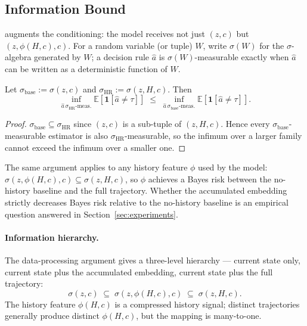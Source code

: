 \subsection{\temporalmethodfull{} Information Bound}
\label{app:history-monotonicity}

\temporalmethodfull augments the conditioning: the model receives not just $(z, c)$ but $(z, \phi(H, c), c)$. For a random variable (or tuple) $W$, write $\sigma(W)$ for the $\sigma$-algebra generated by $W$; a decision rule $\hat{a}$ is $\sigma(W)$-measurable exactly when $\hat{a}$ can be written as a deterministic function of $W$.

\begin{proposition}
\label{prop:history-monotonicity}
Let $\sigma_{\mathrm{base}} := \sigma(z, c)$ and $\sigma_{\mathrm{HR}} := \sigma(z, H, c)$. Then
\[
\inf_{\hat{a} \,\sigma_{\mathrm{HR}}\text{-meas.}} \mathbb{E}\!\left[\mathbf{1}\!\left[\hat{a} \neq \tau\right]\right] \;\leq\; \inf_{\hat{a} \,\sigma_{\mathrm{base}}\text{-meas.}} \mathbb{E}\!\left[\mathbf{1}\!\left[\hat{a} \neq \tau\right]\right].
\]
\end{proposition}

\begin{proof}
$\sigma_{\mathrm{base}} \subseteq \sigma_{\mathrm{HR}}$ since $(z, c)$ is a sub-tuple of $(z, H, c)$. Hence every $\sigma_{\mathrm{base}}$-measurable estimator is also $\sigma_{\mathrm{HR}}$-measurable, so the infimum over a larger family cannot exceed the infimum over a smaller one.
\end{proof}

The same argument applies to any history feature $\phi$ used by the model: $\sigma(z, \phi(H, c), c) \subseteq \sigma(z, H, c)$, so $\phi$ achieves a Bayes risk between the no-history baseline and the full trajectory. Whether the \temporalmethod accumulated embedding strictly decreases Bayes risk relative to the no-history baseline is an empirical question answered in Section~\ref{sec:experiments}.

\paragraph{Information hierarchy.}
The data-processing argument gives a three-level hierarchy --- current state only, current state plus the accumulated embedding, current state plus the full trajectory:
\[
\sigma\!\left(z, c\right) \;\subseteq\; \sigma\!\left(z, \phi(H, c), c\right) \;\subseteq\; \sigma\!\left(z, H, c\right).
\]
The history feature $\phi(H, c)$ is a compressed history signal; distinct trajectories generally produce distinct $\phi(H, c)$, but the mapping is many-to-one.

